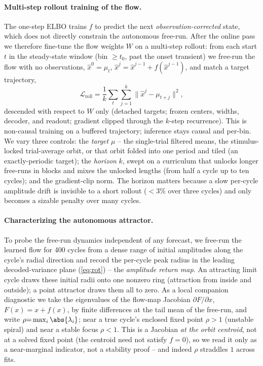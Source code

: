 \documentclass{article}
\begin{document}
\paragraph{Multi-step rollout training of the flow.}
The one-step ELBO trains $f$ to predict the next \emph{observation-corrected} state, which does
not directly constrain the autonomous free-run. After the online pass we therefore fine-tune the
flow weights $W$ on a multi-step rollout: from each start $t$ in the steady-state window (bin
$\ge t_0$, past the onset transient) we free-run the flow with no observations,
$\hat x^{0}=\mu_t$, $\hat x^{j}=\hat x^{j-1}+f(\hat x^{j-1})$, and match a target trajectory,
\begin{equation}
  \mathcal{L}_{\text{roll}} = \frac{1}{k}\sum_{t}\sum_{j=1}^{k}\big\lVert \hat x^{j}-\mu_{t+j}\big\rVert^2,
  \label{eq:roll}
\end{equation}
descended with respect to $W$ only (detached targets; frozen centers, widths, decoder, and
readout; gradient clipped through the $k$-step recurrence). This is non-causal training on a
buffered trajectory; inference stays causal and per-bin. We vary three controls: the
\emph{target} $\mu$ -- the single-trial filtered means, the stimulus-locked trial-average orbit,
or that orbit folded into one period and tiled (an exactly-periodic target); the \emph{horizon}
$k$, swept on a curriculum that unlocks longer free-runs in blocks and mixes the unlocked lengths
(from half a cycle up to ten cycles); and the gradient-clip norm. The horizon matters because a
slow per-cycle amplitude drift is invisible to a short rollout ($<\!3\%$ over three cycles) and
only becomes a sizable penalty over many cycles.

\paragraph{Characterizing the autonomous attractor.}
To probe the free-run dynamics independent of any forecast, we free-run the learned flow for
\num{400} cycles from a dense range of initial amplitudes along the cycle's radial direction and
record the per-cycle peak radius in the leading decoded-variance plane (\cref{eq:rot}) -- the
\emph{amplitude return map}. An attracting limit cycle draws these initial radii onto one nonzero
ring (attraction from inside and outside); a point attractor draws them all to zero. As a local
companion diagnostic we take the eigenvalues of the flow-map Jacobian $\partial F/\partial x$,
$F(x){=}x{+}f(x)$, by finite differences at the tail mean of the free-run, and write
$\rho{=}\max_i\abs{\lambda_i}$; near a true cycle's enclosed fixed point $\rho{>}1$ (unstable
spiral) and near a stable focus $\rho{<}1$. This is a Jacobian \emph{at the orbit centroid}, not
at a solved fixed point (the centroid need not satisfy $f{=}0$), so we read it only as a
near-marginal indicator, not a stability proof -- and indeed $\rho$ straddles $1$ across fits.
\end{document}
